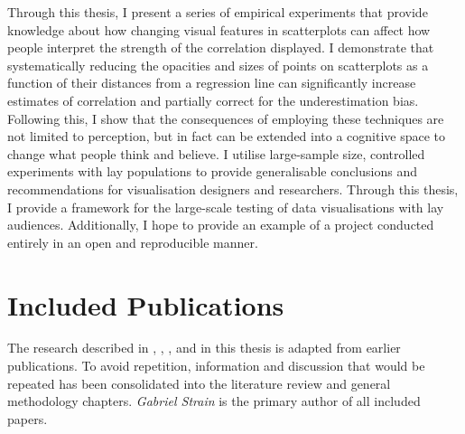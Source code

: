 \documentclass[../main.tex]{subfiles}
\begin{document}
Through this thesis, I present a series of empirical experiments that
provide knowledge about how changing visual features in scatterplots can
affect how people interpret the strength of the correlation displayed. I
demonstrate that systematically reducing the opacities and sizes of
points on scatterplots as a function of their distances from a
regression line can significantly increase estimates of correlation and
partially correct for the underestimation bias. Following this, I show
that the consequences of employing these techniques are not limited to
perception, but in fact can be extended into a cognitive space to change
what people think and believe. I utilise large-sample size, controlled
experiments with lay populations to provide generalisable conclusions
and recommendations for visualisation designers and researchers. Through
this thesis, I provide a framework for the large-scale testing of data
visualisations with lay audiences. Additionally, I hope to provide an
example of a project conducted entirely in an open and reproducible
manner.

\section{Included Publications}\label{included-publications}

The research described in ,
, , and
 in this thesis is adapted from earlier
publications. To avoid repetition, information and discussion that would
be repeated has been consolidated into the literature review and general
methodology chapters. \emph{Gabriel Strain} is the primary author of all
included papers.
\end{document}
